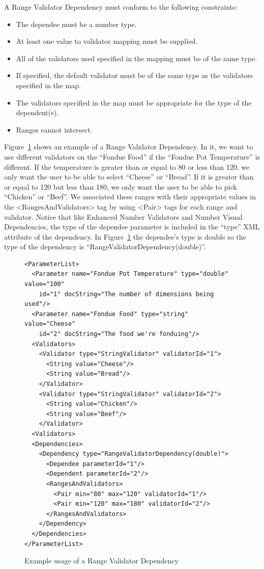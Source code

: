 A Range Validator Dependency must conform to the following constraints:
\begin{itemize}
\item The dependee must be a number type.
\item At least one value to validator mapping must be supplied.
\item All of the validators used specified in the mapping must be of the same type.
\item If specified, the default validator must be of the same type as the validators specified in the map.
\item The validators specified in the map must be appropriate for the type of the dependent(s).
\item Ranges cannot intersect.
\end{itemize}

Figure~\ref{RangeValiDepXML} shows an example of a Range Validator Dependency. In it, we want to use different validators
on the ``Fondue Food'' if the ``Fondue Pot Temperature'' is different. If the temperature is greater than or equal to 80 or less than 120,
we only want the user to be able to select ``Cheese'' or ``Bread''. If it is greater than or equal to 120 but less than 180, we only want the
user to be able to pick ``Chicken'' or ``Beef''. We associated these ranges with their appropriate values in the <RangesAndValidators> tag by
using <Pair> tags for each range and validator. Notice that like Enhanced Number Validators and Number Visual Dependencies, the type of the dependee parameter is 
included in the ``type'' XML attribute of the dependency. In Figure~\ref{RangeValiDepXML} the dependee's type is double so the type of the dependency is 
``RangeValidatorDependency(double)''.
\begin{figure}
\centering
{\footnotesize
\begin{Verbatim}
<ParameterList>
  <Parameter name="Fondue Pot Temperature" type="double" value="100"
    id="1" docString="The number of dimensions being used"/>
  <Parameter name="Fondue Food" type="string" value="Cheese"
    id="2" docString="The food we're fonduing"/>
  <Validators>
    <Validator type="StringValidator" validatorId="1">
      <String value="Cheese"/>
      <String value="Bread"/>
    </Validator>
    <Validator type="StringValidator" validatorId="2">
      <String value="Chicken"/>
      <String value="Beef"/>
    </Validator>
  <Validators>
  <Dependencies>
    <Dependency type="RangeValidatorDependency(double)">
      <Dependee parameterId="1"/>
      <Dependent parameterId="2"/>
      <RangesAndValidators>
        <Pair min="80" max="120" validatorId="1"/>
        <Pair min="120" max="180" validatorId="2"/>
      </RangesAndValidators>
    </Dependency>
  </Dependencies>
</ParameterList>
\end{Verbatim}
}
\caption{Example usage of a Range Validator Dependency}
\label{RangeValiDepXML}
\end{figure}


